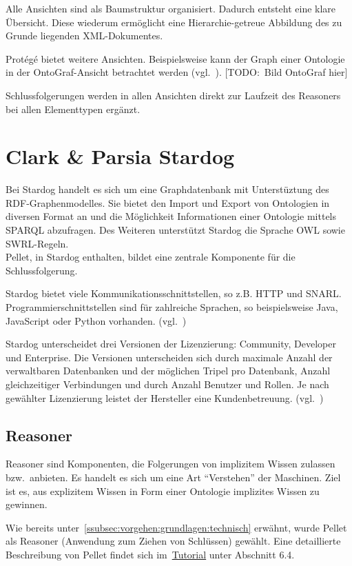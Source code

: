 Alle Ansichten sind als Baumstruktur organisiert. Dadurch entsteht eine klare Übersicht. Diese wiederum ermöglicht eine Hierarchie-getreue Abbildung des zu Grunde liegenden XML-Dokumentes.

Protégé bietet weitere Ansichten. Beispielsweise kann der Graph einer Ontologie in der OntoGraf-Ansicht betrachtet werden (vgl.~\cite{protegeView}).
[TODO:\ Bild OntoGraf hier]

Schlussfolgerungen werden in allen Ansichten direkt zur Laufzeit des Reasoners bei allen Elementtypen ergänzt.

\section{Clark \& Parsia Stardog}
\label{sec:komponenten_stardog}
Bei Stardog handelt es sich um eine Graphdatenbank mit Unterstüztung des RDF-Graphenmodelles. Sie bietet den Import und Export von Ontologien in diversen Format an und die Möglichkeit Informationen einer Ontologie mittels SPARQL abzufragen. Des Weiteren unterstützt Stardog die Sprache OWL sowie SWRL-Regeln.\\
Pellet, in Stardog enthalten, bildet eine zentrale Komponente für die Schlussfolgerung.

Stardog bietet viele Kommunikationsschnittstellen, so z.B. HTTP und SNARL.\\
Programmierschnittstellen sind für zahlreiche Sprachen, so beispielsweise Java, JavaScript oder Python vorhanden.
(vgl.~\cite{stardogDocu})

Stardog unterscheidet drei Versionen der Lizenzierung: Community, Developer und Enterprise. Die Versionen unterscheiden sich durch maximale Anzahl der verwaltbaren Datenbanken und der möglichen Tripel pro Datenbank, Anzahl gleichzeitiger Verbindungen und durch Anzahl Benutzer und Rollen. Je nach gewählter Lizenzierung leistet der Hersteller eine Kundenbetreuung.
(vgl.~\cite{stardogDocu})

\subsection{Reasoner}
\label{subsec:komponenten_reasoner}
Reasoner sind Komponenten,  die Folgerungen von implizitem Wissen zulassen bzw.\ anbieten. Es handelt es sich um eine Art ``Verstehen'' der Maschinen. Ziel ist es, aus explizitem Wissen in Form einer Ontologie implizites Wissen zu gewinnen.

Wie bereits unter~\autoref{ssubsec:vorgehen:grundlagen:technisch} erwähnt, wurde Pellet als Reasoner (Anwendung zum Ziehen von Schlüssen) gewählt. Eine detaillierte Beschreibung von Pellet findet sich im~\hyperref[sec:anhang:tutorial_dokument]{Tutorial} unter Abschnitt 6.4.

